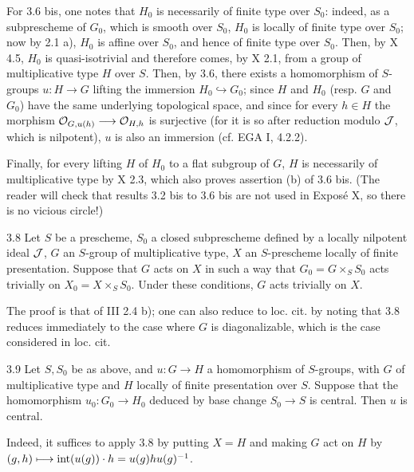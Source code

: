 For 3.6 bis, one notes that $H_0$ is necessarily of finite type over $S_0$: indeed, as a subprescheme of $G_0$, which is smooth over $S_0$, $H_0$ is locally of finite type over $S_0$; now by 2.1 a), $H_0$ is affine over $S_0$, and hence of finite type over $S_0$. Then, by X 4.5, $H_0$ is quasi-isotrivial and therefore comes, by X 2.1, from a group of multiplicative type $H$ over $S$. Then, by 3.6, there exists a homomorphism of $S$-groups $u:H\to G$ lifting the immersion $H_0\hookrightarrow G_0$; since $H$ and $H_0$ (resp. $G$ and $G_0$) have the same underlying topological space, and since for every $h\in H$ the morphism $\OO_{G,u(h)}\to\OO_{H,h}$ is surjective (for it is so after reduction modulo $\cal J$, which is nilpotent), $u$ is also an immersion (cf. EGA I, 4.2.2).

Finally, for every lifting $H$ of $H_0$ to a flat subgroup of $G$, $H$ is necessarily of multiplicative type by X 2.3, which also proves assertion (b) of 3.6 bis. (The reader will check that results 3.2 bis to 3.6 bis are not used in Expos\'e X, so there is no vicious circle!)
\begin{proposition}{3.8}\label{IX.3.8}
 Let $S$ be a prescheme, $S_0$ a closed subprescheme defined by a locally nilpotent ideal $\cal J$, $G$ an $S$-group of multiplicative type, $X$ an $S$-prescheme locally of finite presentation. Suppose that $G$ acts on $X$ in such a way that $G_0=G\times_S S_0$ acts trivially on $X_0=X\times_S S_0$. Under these conditions, $G$ acts trivially on $X$.
\end{proposition}
The proof is that of III 2.4 b); one can also reduce to loc. cit. by noting that 3.8 reduces immediately to the case where $G$ is diagonalizable, which is the case considered in loc. cit.
\begin{corollary}{3.9}\label{IX.3.9}
Let $S,S_0$ be as above, and $u:G\to H$ a homomorphism of $S$-groups, with $G$ of multiplicative type and $H$ locally of finite presentation over $S$. Suppose that the homomorphism $u_0:G_0\to H_0$ deduced by base change $S_0\to S$ is central. Then $u$ is central.
\end{corollary}
Indeed, it suffices to apply 3.8 by putting $X=H$ and making $G$ act on $H$ by $(g,h)\mto\operatorname{int}(u(g))\cdot h=u(g)h u(g)^{-1}$.

